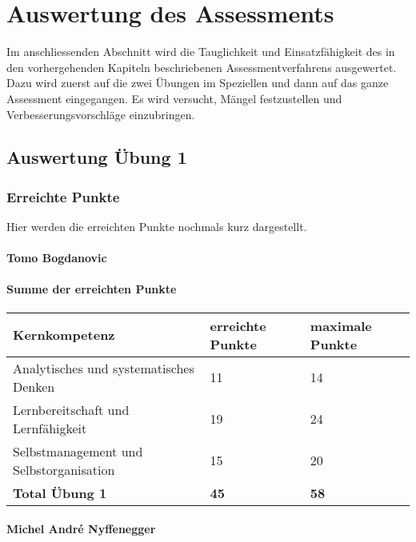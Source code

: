 \chapter{Auswertung des Assessments}

Im anschliessenden Abschnitt wird die Tauglichkeit und Einsatzfähigkeit des in den vorhergehenden Kapiteln beschriebenen Assessmentverfahrens ausgewertet. Dazu wird zuerst auf die zwei Übungen im Speziellen und dann auf das ganze Assessment eingegangen. Es wird versucht, Mängel festzustellen und Verbesserungsvorschläge einzubringen.

\section{Auswertung Übung 1}

\subsection{Erreichte Punkte}
Hier werden die erreichten Punkte nochmals kurz dargestellt.
\subsubsection{Tomo Bogdanovic}

\subsubsection{Summe der erreichten Punkte}
\begin{center}
  \begin{tabular}{ | p{7cm} | p{3cm} | p{3cm} |}
   \hline
   \textbf{Kernkompetenz} & \textbf{erreichte Punkte} & \textbf{maximale Punkte} \\ \hline
   Analytisches und systematisches Denken & 11 & 14\\ \hline
  Lernbereitschaft und Lernfähigkeit & 19 & 24\\ \hline
   Selbstmanagement und Selbstorganisation & 15 & 20\\ \hline
   \textbf{Total Übung 1} & \textbf{45} & \textbf{58}\\ \hline
  \end{tabular}
\end{center}

\subsubsection{Michel Andr\'{e} Nyffenegger}

